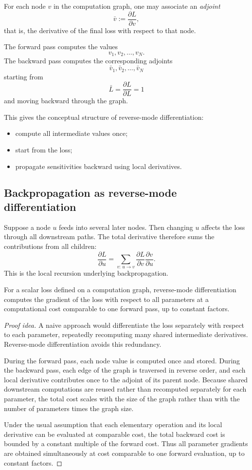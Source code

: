 For each node $v$ in the computation graph, one may associate an \emph{adjoint}
\[
\bar v := \frac{\partial L}{\partial v},
\]
that is, the derivative of the final loss with respect to that node.

The forward pass computes the values
\[
v_1,v_2,\dots,v_N.
\]
The backward pass computes the corresponding adjoints
\[
\bar v_1,\bar v_2,\dots,\bar v_N
\]
starting from
\[
\bar L = \frac{\partial L}{\partial L}=1
\]
and moving backward through the graph.

This gives the conceptual structure of reverse-mode differentiation:

\begin{itemize}
    \item compute all intermediate values once;
    \item start from the loss;
    \item propagate sensitivities backward using local derivatives.
\end{itemize}

\subsection*{Backpropagation as reverse-mode differentiation}

Suppose a node $u$ feeds into several later nodes. Then changing $u$ affects the loss through all downstream paths. The total derivative therefore sums the contributions from all children:
\[
\frac{\partial L}{\partial u}
=
\sum_{v:\,u\to v}
\frac{\partial L}{\partial v}\frac{\partial v}{\partial u}.
\]
This is the local recursion underlying backpropagation.

\begin{proposition}
For a scalar loss defined on a computation graph, reverse-mode differentiation computes the gradient of the loss with respect to all parameters at a computational cost comparable to one forward pass, up to constant factors.
\end{proposition}

\begin{proof}[Proof idea]
A naive approach would differentiate the loss separately with respect to each parameter, repeatedly recomputing many shared intermediate derivatives. Reverse-mode differentiation avoids this redundancy.

During the forward pass, each node value is computed once and stored. During the backward pass, each edge of the graph is traversed in reverse order, and each local derivative contributes once to the adjoint of its parent node. Because shared downstream computations are reused rather than recomputed separately for each parameter, the total cost scales with the size of the graph rather than with the number of parameters times the graph size.

Under the usual assumption that each elementary operation and its local derivative can be evaluated at comparable cost, the total backward cost is bounded by a constant multiple of the forward cost. Thus all parameter gradients are obtained simultaneously at cost comparable to one forward evaluation, up to constant factors.
\end{proof}

